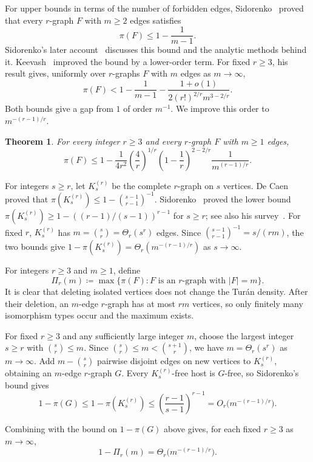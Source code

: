 \documentclass[10pt]{article}
\numberwithin{equation}{section}
\newtheorem{theorem}{Theorem}[section]
\begin{document}
For upper bounds in terms of the number of forbidden edges, Sidorenko~\cite{Sidorenko89} proved that every $r$-graph $F$ with $m\ge2$ edges satisfies
\[
\pi(F)\le1-\frac1{m-1}.
\]
Sidorenko's later account~\cite{Sidorenko94} discusses this bound and the analytic methods behind it. Keevash~\cite[Theorem~1(ii)]{Keevash05} improved the bound by a lower-order term. For fixed $r\ge3$, his result gives, uniformly over $r$-graphs $F$ with $m$ edges as $m\to\infty$,
\[
\pi(F)<1-\frac1{m-1}
-\frac{1+o(1)}{2(r!)^{2/r}m^{3-2/r}}.
\]
Both bounds give a gap from $1$ of order $m^{-1}$. We improve this order to $m^{-(r-1)/r}$.

\begin{theorem}\label{thm:main}
For every integer $r\ge3$ and every $r$-graph $F$ with $m\ge1$ edges,
\[
\pi(F)\le1-
\frac1{4r^2}
\left(\frac4r\right)^{1/r}
\left(1-\frac1r\right)^{2-2/r}\frac{1}{m^{(r-1)/r}}.
\]
\end{theorem}


For integers $s\ge r$, let $K_s^{(r)}$ be the complete $r$-graph on $s$ vertices. De Caen~\cite{deCaen83} proved that $\pi(K_s^{(r)})\le1-\binom{s-1}{r-1}^{-1}$. Sidorenko~\cite{Sidorenko81} proved the lower bound $\pi(K_s^{(r)})\ge1-((r-1)/(s-1))^{r-1}$ for $s\ge r$; see also his survey~\cite[Section~4.2]{SidorenkoSurvey}. For fixed $r$, $K_s^{(r)}$ has $m=\binom sr=\Theta_r(s^r)$ edges. Since $\binom{s-1}{r-1}^{-1}=s/(rm)$, the two bounds give $1-\pi(K_s^{(r)})=\Theta_r(m^{-(r-1)/r})$ as $s\to\infty$.

For integers $r\ge3$ and $m\ge1$, define
\[
\Pi_r(m)\coloneqq
\max\{\pi(F)\colon F\text{ is an $r$-graph with }|F|=m\}.
\]
It is clear that  deleting isolated vertices does not change the Tur\'an density. After their deletion, an $m$-edge $r$-graph has at most $rm$ vertices, so only finitely many isomorphism types occur and the maximum exists.

For fixed $r\ge3$ and any sufficiently large integer $m$, choose the largest integer $s\ge r$ with $\binom sr\le m$. Since $\binom sr\le m<\binom{s+1}r$, we have $m=\Theta_r(s^r)$ as $m\to\infty$. Add $m-\binom sr$ pairwise disjoint edges on new vertices to $K_s^{(r)}$, obtaining an $m$-edge $r$-graph $G$. Every $K_s^{(r)}$-free host is $G$-free, so Sidorenko's bound gives
\[
1-\pi(G)\le1-\pi(K_s^{(r)})
\le\left(\frac{r-1}{s-1}\right)^{r-1}
=O_r\bigl(m^{-(r-1)/r}\bigr).
\]

Combining  with the bound on $1-\pi(G)$ above gives, for each fixed $r\ge3$ as $m\to\infty$,
\begin{equation}\label{eq:worst-case}
1-\Pi_r(m)=\Theta_r\bigl(m^{-(r-1)/r}\bigr).
\end{equation}
\end{document}
